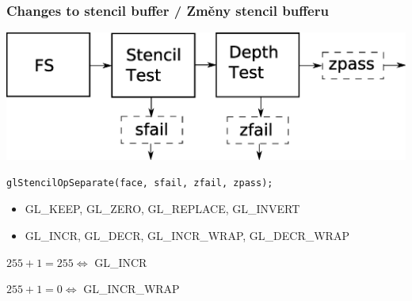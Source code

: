 \begin{frame}[fragile]\frametitle{Changes to stencil buffer / Změny stencil bufferu}\scriptsize

  \includegraphics[width=\textwidth]{pics/shadows/shadowVolumes/stencil-test2.eps}

  \vfill

\begin{verbatim}
glStencilOpSeparate(face, sfail, zfail, zpass);
\end{verbatim}

  \begin{itemize}
    \item GL\_KEEP, GL\_ZERO, GL\_REPLACE, GL\_INVERT
    \item GL\_INCR, GL\_DECR, GL\_INCR\_WRAP, GL\_DECR\_WRAP
  \end{itemize}

  \vfill

  $255 + 1 = 255 \Longleftrightarrow $ GL\_INCR

  $255 + 1 = 0 \Longleftrightarrow $ GL\_INCR\_WRAP

\end{frame}





